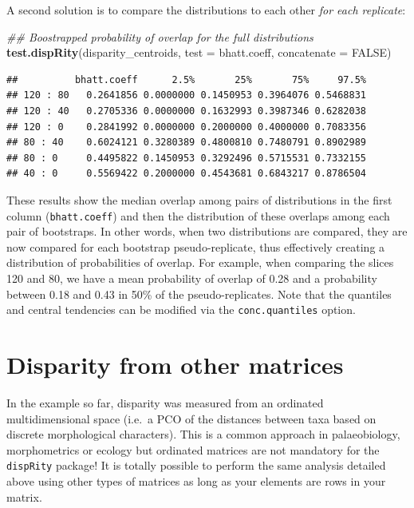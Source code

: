 \documentclass[
]{book}
\newenvironment{Shaded}{\begin{snugshade}}{\end{snugshade}}
\newcommand{\CommentTok}[1]{\textcolor[rgb]{0.56,0.35,0.01}{\textit{#1}}}
\newcommand{\DataTypeTok}[1]{\textcolor[rgb]{0.13,0.29,0.53}{#1}}
\newcommand{\KeywordTok}[1]{\textcolor[rgb]{0.13,0.29,0.53}{\textbf{#1}}}
\newcommand{\NormalTok}[1]{#1}
\newcommand{\OtherTok}[1]{\textcolor[rgb]{0.56,0.35,0.01}{#1}}
\begin{document}
A second solution is to compare the distributions to each other \emph{for each replicate}:

\begin{Shaded}
\begin{Highlighting}[]
\CommentTok{\#\# Boostrapped probability of overlap for the full distributions}
\KeywordTok{test.dispRity}\NormalTok{(disparity\_centroids, }\DataTypeTok{test =}\NormalTok{ bhatt.coeff,}
              \DataTypeTok{concatenate =} \OtherTok{FALSE}\NormalTok{)}
\end{Highlighting}
\end{Shaded}

\begin{verbatim}
##          bhatt.coeff      2.5%       25%       75%     97.5%
## 120 : 80   0.2641856 0.0000000 0.1450953 0.3964076 0.5468831
## 120 : 40   0.2705336 0.0000000 0.1632993 0.3987346 0.6282038
## 120 : 0    0.2841992 0.0000000 0.2000000 0.4000000 0.7083356
## 80 : 40    0.6024121 0.3280389 0.4800810 0.7480791 0.8902989
## 80 : 0     0.4495822 0.1450953 0.3292496 0.5715531 0.7332155
## 40 : 0     0.5569422 0.2000000 0.4543681 0.6843217 0.8786504
\end{verbatim}

These results show the median overlap among pairs of distributions in the first column (\texttt{bhatt.coeff}) and then the distribution of these overlaps among each pair of bootstraps.
In other words, when two distributions are compared, they are now compared for each bootstrap pseudo-replicate, thus effectively creating a distribution of probabilities of overlap.
For example, when comparing the slices 120 and 80, we have a mean probability of overlap of 0.28 and a probability between 0.18 and 0.43 in 50\% of the pseudo-replicates.
Note that the quantiles and central tendencies can be modified via the \texttt{conc.quantiles} option.

\hypertarget{other-matrices}{%
\section{Disparity from other matrices}\label{other-matrices}}

In the example so far, disparity was measured from an ordinated multidimensional space (i.e.~a PCO of the distances between taxa based on discrete morphological characters).
This is a common approach in palaeobiology, morphometrics or ecology but ordinated matrices are not mandatory for the \texttt{dispRity} package!
It is totally possible to perform the same analysis detailed above using other types of matrices as long as your elements are rows in your matrix.
\end{document}
